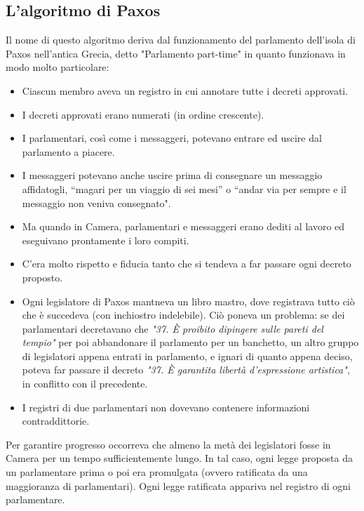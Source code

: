 \subsection{L'algoritmo di Paxos}
Il nome di questo algoritmo deriva dal funzionamento del parlamento dell'isola di Paxos nell'antica Grecia, detto "Parlamento part-time" in quanto funzionava in modo molto particolare:
\begin{itemize}
    \item Ciascun membro aveva un registro in cui annotare tutte i decreti approvati.
    \item I decreti approvati erano numerati (in ordine crescente).
    \item I parlamentari, così come i messaggeri, potevano entrare ed uscire dal parlamento a piacere.
    \item I messaggeri potevano anche uscire prima di consegnare un messaggio affidatogli, “magari per un viaggio di sei mesi” o “andar via per sempre e il messaggio non veniva consegnato".
    \item Ma quando in Camera, parlamentari e messaggeri erano dediti al lavoro ed eseguivano prontamente i loro compiti.
    \item C’era molto rispetto e fiducia tanto che si tendeva a far passare ogni decreto proposto.
    \item Ogni legislatore di Paxos mantneva un libro mastro, dove registrava tutto ciò che è succedeva (con inchiostro indelebile).
    Ciò poneva un problema: se dei parlamentari decretavano che \textit{"37. È proibito dipingere sulle pareti del tempio"} per poi abbandonare il parlamento per un banchetto, un altro gruppo di legislatori appena entrati in parlamento, e ignari di quanto appena deciso, poteva far passare il decreto \textit{"37. È garantita libertà d'espressione artistica"}, in conflitto con il precedente.
    \item I registri di due parlamentari non dovevano contenere informazioni contraddittorie.
\end{itemize}

Per garantire progresso occorreva che almeno la metà dei legislatori fosse in Camera per un tempo sufficientemente lungo. In tal caso, ogni legge proposta da un parlamentare prima o poi era promulgata (ovvero ratificata da una maggioranza di parlamentari). Ogni legge ratificata appariva nel registro di ogni parlamentare.

